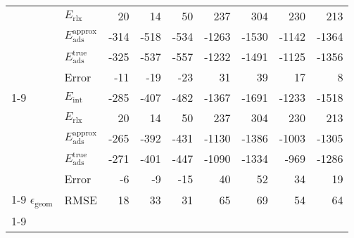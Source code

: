 \begin{longtable}{llrrrrrrr}
 & $E_\textrm{rlx}$ & 20 & 14 & 50 & 237 & 304 & 230 & 213 \\
 & $E_\textrm{ads}^\textrm{approx}$ & -314 & -518 & -534 & -1263 & -1530 & -1142 & -1364 \\
 & $E_\textrm{ads}^\textrm{true}$ & -325 & -537 & -557 & -1232 & -1491 & -1125 & -1356 \\
 & Error & -11 & -19 & -23 & 31 & 39 & 17 & 8 \\
\cline{1-9}
\multirow[]{5}{*}{\rotatebox{90}{HSE06-D4}} & $E_\textrm{int}$ & -285 & -407 & -482 & -1367 & -1691 & -1233 & -1518 \\
 & $E_\textrm{rlx}$ & 20 & 14 & 50 & 237 & 304 & 230 & 213 \\
 & $E_\textrm{ads}^\textrm{approx}$ & -265 & -392 & -431 & -1130 & -1386 & -1003 & -1305 \\
 & $E_\textrm{ads}^\textrm{true}$ & -271 & -401 & -447 & -1090 & -1334 & -969 & -1286 \\
 & Error & -6 & -9 & -15 & 40 & 52 & 34 & 19 \\
\cline{1-9}
$\epsilon_\textrm{geom}$ & RMSE & 18 & 33 & 31 & 65 & 69 & 54 & 64 \\
\cline{1-9}
\end{longtable}